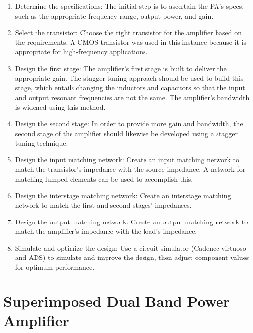 \begin{enumerate}[label=\roman*. ]
    \item Determine the specifications: The initial step is to ascertain the PA's specs, such as the appropriate frequency range, output power, and gain.
    \item Select the transistor: Choose the right transistor for the amplifier based on the requirements. A CMOS transistor was used in this instance because it is appropriate for high-frequency applications.
    \item Design the first stage: The amplifier's first stage is built to deliver the appropriate gain. The stagger tuning approach should be used to build this stage, which entails changing the inductors and capacitors so that the input and output resonant frequencies are not the same. The amplifier's bandwidth is widened using this method.
    \item Design the second stage: In order to provide more gain and bandwidth, the second stage of the amplifier should likewise be developed using a stagger tuning technique.
    \item Design the input matching network: Create an input matching network to match the transistor's impedance with the source impedance. A network for matching lumped elements can be used to accomplish this.
    \item Design the interstage matching network: Create an interstage matching network to match the first and second stages' impedances.
    \item Design the output matching network: Create an output matching network to match the amplifier's impedance with the load's impedance.
    \item Simulate and optimize the design: Use a circuit simulator (Cadence virtuoso and ADS) to simulate and improve the design, then adjust component values for optimum performance.
\end{enumerate}

\section{Superimposed Dual Band Power Amplifier}
